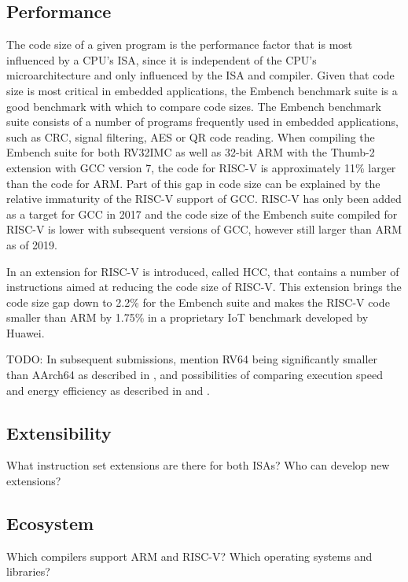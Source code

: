 \documentclass[conference]{IEEEtran}
\begin{document}
	\subsection{Performance}
	The code size of a given program is the performance factor that is most influenced by a \gls{CPU}'s \gls{ISA},
	since it is independent of the \gls{CPU}'s microarchitecture and only influenced by the \gls{ISA} and compiler.
	Given that code size is most critical in embedded applications, the Embench benchmark suite is a good benchmark
	with which to compare code sizes. The Embench benchmark suite consists of a number of programs frequently used in embedded
	applications, such as CRC, signal filtering, AES or QR code reading. \cite{Patterson2019}
	When compiling the Embench suite for both RV32IMC as well as 32-bit ARM with the Thumb-2 extension with GCC version 7,
	the code for RISC-V is approximately 11\% larger than the code for ARM. \cite{Perotti2020}
	Part of this gap in code size can be explained by the relative immaturity of the RISC-V support of
	GCC. RISC-V has only been added as a target for GCC in 2017 and the code size of the Embench suite
	compiled for RISC-V is lower with subsequent versions of GCC, however still larger than ARM as of 2019. \cite{Patterson2019}

	In \cite{Perotti2020} an extension for RISC-V is introduced, called HCC, that contains a number of instructions
	aimed at reducing the code size of RISC-V. This extension brings the code size gap down to 2.2\% for the Embench suite
	and makes the RISC-V code smaller than ARM by 1.75\% in a proprietary IoT benchmark developed by Huawei. \cite{Perotti2020}
	
	TODO: In subsequent submissions, mention RV64 being significantly smaller than AArch64 as described in \cite[page 62]{Waterman2016},
	and possibilities of comparing execution speed and energy efficiency as described in \cite{Blem2013} and \cite{Akram2017}.

	\subsection{Extensibility}
	What instruction set extensions are there for both ISAs? Who can develop new extensions?
	\subsection{Ecosystem}
	Which compilers support ARM and RISC-V? Which operating systems and libraries?
\end{document}
